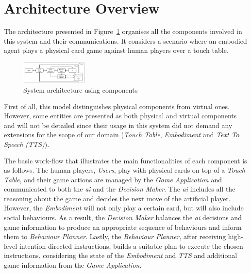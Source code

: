 \section{Architecture Overview}
\label{section:architecture-overview}

The architecture presented in Figure~\ref{fig:architecture} organises all the components involved in this system and their communications.
It considers a scenario where an embodied agent plays a physical card game against human players over a touch table.

\begin{figure}[ht]
  \centering
    \includegraphics[width=0.3\textwidth]{./img/6/architecture}
  \caption{System architecture using components}
\label{fig:architecture}
\end{figure}

First of all, this model distinguishes physical components from virtual ones.
However, some entities are presented as both physical and virtual components and will not be detailed since their usage in this system did not demand any extensions for the scope of our domain (\emph{Touch Table}, \emph{Embodiment} and \emph{Text To Speech (TTS)}).

The basic work-flow that illustrates the main functionalities of each component is as follows.
The human players, \emph{Users}, play with physical cards on top of a \emph{Touch Table}, and their game actions are managed by the \emph{Game Application} and communicated to both the \emph{\ac{ai}} and the \emph{Decision Maker}.
The \emph{\ac{ai}} includes all the reasoning about the game and decides the next move of the artificial player.
However, the \emph{Embodiment} will not only play a certain card, but will also include social behaviours.
As a result, the \emph{Decision Maker} balances the \emph{\ac{ai}} decisions and game information to produce an appropriate sequence of behaviours and inform them to \emph{Behaviour Planner}.
Lastly, the \emph{Behaviour Planner}, after receiving high-level intention-directed instructions, builds a suitable plan to execute the chosen instructions, considering the state of the \emph{Embodiment} and \emph{TTS} and additional game information from the \emph{Game Application}.


